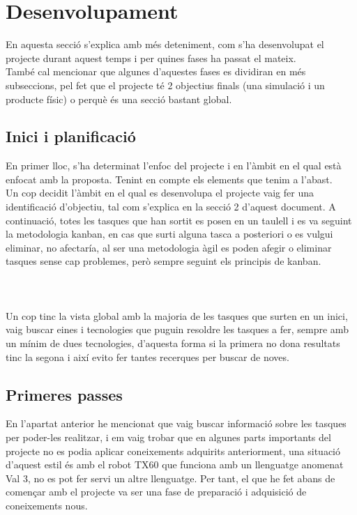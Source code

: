 ﻿\documentclass[10pt,a4paper,twocolumn,twoside]{article}
\begin{document}
\section{Desenvolupament}

En aquesta secció s'explica amb més deteniment, com s'ha desenvolupat el projecte durant aquest temps i per quines fases ha passat el mateix. 
\\

També cal mencionar que algunes d'aquestes fases es dividiran en més subseccions, pel fet que el projecte té 2 objectius finals (una simulació i un producte físic) o perquè  és una secció bastant global.

\subsection{Inici i planificació}

En primer lloc, s'ha determinat l'enfoc del projecte i en l'àmbit en el qual està enfocat amb la proposta. Tenint en compte els elements que tenim a l'abast.
\\

Un cop decidit l'àmbit en el qual es desenvolupa el projecte vaig fer una identificació d'objectiu, tal com s'explica en la secció 2 d'aquest document. A continuació, totes les tasques que han sortit es posen en un taulell i es va seguint la metodologia kanban, en cas que surti alguna tasca a posteriori o es vulgui eliminar, no afectaría, al ser una metodologia àgil es poden afegir o eliminar tasques sense cap problemes, però sempre seguint els principis de kanban.
\\
\\
\\
\\

Un cop tinc la vista global amb la majoria de les tasques que surten en un inici, vaig buscar eines i tecnologies que puguin resoldre les tasques a fer, sempre amb un mínim de dues tecnologies, d'aquesta forma si la primera no dona resultats tinc la segona i així evito fer tantes recerques per buscar de noves.
\subsection{Primeres passes}

En l'apartat anterior he mencionat que vaig buscar informació sobre les tasques per poder-les realitzar, i em vaig trobar que en algunes parts importants del projecte no es podia aplicar coneixements adquirits anteriorment, una situació d'aquest estil és amb el robot TX60 que funciona amb un llenguatge anomenat Val 3, no es pot fer servi un altre llenguatge. Per tant, el que he fet abans de començar amb el projecte va ser una fase de preparació i adquisició de coneixements nous.
\\
\end{document}
